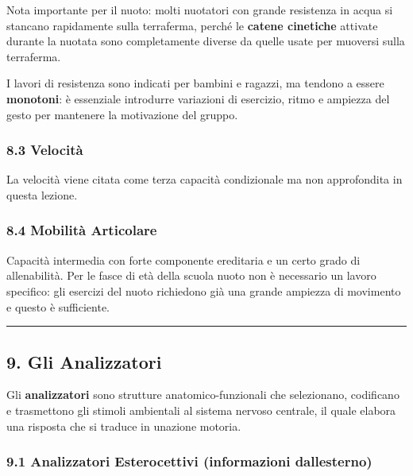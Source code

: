 \documentclass[a4paper,11pt]{article}
\begin{document}
Nota importante per il nuoto: molti nuotatori con grande resistenza in
acqua si stancano rapidamente sulla terraferma, perché le \textbf{catene
      cinetiche} attivate durante la nuotata sono completamente diverse da
quelle usate per muoversi sulla terraferma.

I lavori di resistenza sono indicati per bambini e ragazzi, ma tendono a
essere \textbf{monotoni}: è essenziale introdurre variazioni di
esercizio, ritmo e ampiezza del gesto per mantenere la motivazione del
gruppo.

\subsubsection{8.3 Velocità}\label{velocituxe0}

La velocità viene citata come terza capacità condizionale ma non
approfondita in questa lezione.

\subsubsection{8.4 Mobilità Articolare}\label{mobilituxe0-articolare}

Capacità intermedia con forte componente ereditaria e un certo grado di
allenabilità. Per le fasce di età della scuola nuoto non è necessario un
lavoro specifico: gli esercizi del nuoto richiedono già una grande
ampiezza di movimento e questo è sufficiente.

\begin{center}\rule{0.5\linewidth}{0.5pt}\end{center}

\subsection{9. Gli Analizzatori}\label{gli-analizzatori-1}

Gli \textbf{analizzatori} sono strutture anatomico-funzionali che
selezionano, codificano e trasmettono gli stimoli ambientali al sistema
nervoso centrale, il quale elabora una risposta che si traduce in
un\textquotesingle azione motoria.

\subsubsection{9.1 Analizzatori Esterocettivi (informazioni
      dall\textquotesingle esterno)}\label{analizzatori-esterocettivi-informazioni-dallesterno}
\end{document}
